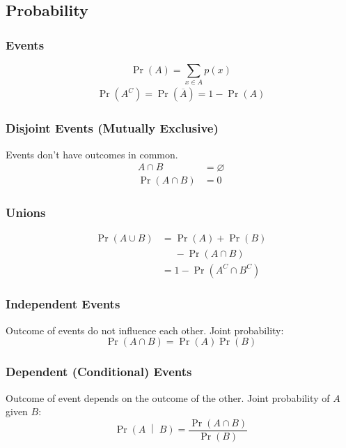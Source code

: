\documentclass{article}
\begin{document}
\begin{multicols}{3}
    \subsection*{Probability}
    \subsubsection*{Events}
    \begin{equation*}
        \Pr{\left( A \right)} = \sum_{x\in A} p(x)
    \end{equation*}
    \begin{align*}
        \Pr{\left( A^C \right)} = \Pr{\left( \overline{A} \right)} = 1 - \Pr{\left( A \right)}
    \end{align*}
    \subsubsection*{Disjoint Events (Mutually Exclusive)}
    Events don't have outcomes in common.
    \begin{align*}
        A \cap B                   & = \varnothing \\
        \Pr{\left(A \cap B\right)} & = 0
    \end{align*}
    \subsubsection*{Unions}
    \begin{align*}
        \Pr{\left( A \cup B \right)} & = \Pr{\left( A \right)} + \Pr{\left( B \right)} \\
                                     & \phantom{=} - \Pr{\left( A \cap B \right)}      \\
                                     & = 1 - \Pr{\left( A^C \cap B^C \right)}
    \end{align*}
    \subsubsection*{Independent Events}
    Outcome of events do not influence each other. Joint probability:
    \begin{equation*}
        \Pr{\left(A \cap B\right)} = \Pr{\left( A \right)}\Pr{\left( B \right)}
    \end{equation*}
    \subsubsection*{Dependent (Conditional) Events}
    Outcome of event depends on the outcome of the other. Joint probability of $A$ given $B$:
    \begin{equation*}
        \Pr{\left(A \;\middle|\; B\right)} = \frac{\Pr{\left( A \cap B \right)}}{\Pr{\left( B \right)}}
    \end{equation*}

\end{multicols}
\end{document}
